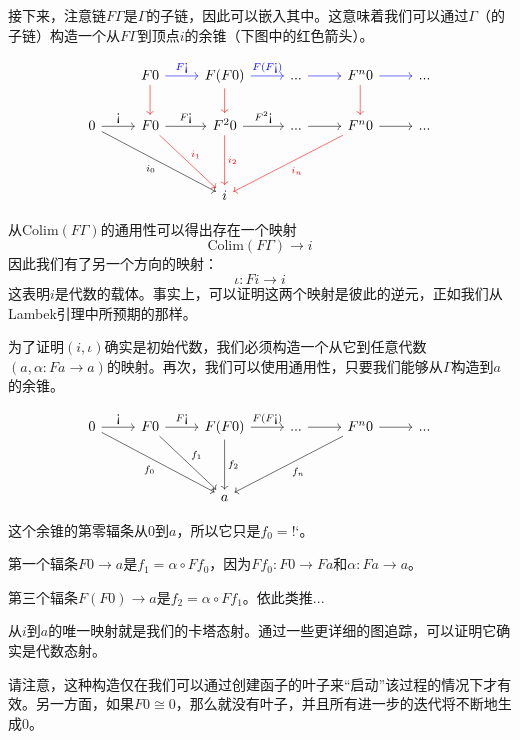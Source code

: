 \documentclass[DaoFP]{subfiles}
\begin{document}
 接下来，注意链$F \Gamma$是$\Gamma$的子链，因此可以嵌入其中。这意味着我们可以通过$\Gamma$（的子链）构造一个从$F \Gamma$到顶点$i$的余锥（下图中的红色箭头）。

 \[
  \begin{tikzcd}
   & F 0
   \arrow[r, blue, "F\mbox{!`}"]
   \arrow[d, red]
   & F (F 0)
   \arrow[r, blue, "F(F\mbox{!`})"]
   \arrow[d, red]
   & ...
   \arrow[r, blue]
   & F^{n} 0
   \arrow[r, blue]
   \arrow[d, red]
   & ...
   \\
   0
   \arrow[r, "\mbox{!`}"]
   \arrow[ddrr,  "i_0"']
   &  F 0
   \arrow[r, "F  \mbox{!`}"]
   \arrow[ddr, red, "i_1"]
   & F^2 0
   \arrow[r, "F^2\mbox{!`}"]
   \arrow[dd, red, "i_2"]
   & ...
   \arrow[r]
   & F^n 0
   \arrow[r]
   \arrow[ddll, red, "i_n"]
   & ...
   \\
   \\
   &&i
  \end{tikzcd}
 \]

 从$\text{Colim} (F \Gamma)$的通用性可以得出存在一个映射
 \[\text{Colim} (F \Gamma) \to i \]
 因此我们有了另一个方向的映射：
 \[ \iota \colon F i \to i \]
 这表明$i$是代数的载体。事实上，可以证明这两个映射是彼此的逆元，正如我们从Lambek引理中所预期的那样。

 为了证明$(i, \iota)$确实是初始代数，我们必须构造一个从它到任意代数$(a, \alpha \colon F a \to a)$的映射。再次，我们可以使用通用性，只要我们能够从$\Gamma$构造到$a$的余锥。

 \[
  \begin{tikzcd}
   0
   \arrow[r, "\mbox{!`}"]
   \arrow[ddrr, "f_0"']
   & F 0
   \arrow[r, "F\mbox{!`}"]
   \arrow[ddr, "f_1"]
   & F (F 0)
   \arrow[r, "F(F\mbox{!`})"]
   \arrow[dd, "f_2"]
   & ...
   \arrow[r]
   & F^n 0
   \arrow[r]
   \arrow[ddll, "f_n"]
   & ...
   \\
   \\
   &&a
  \end{tikzcd}
 \]

 这个余锥的第零辐条从$0$到$a$，所以它只是$f_0 = \mbox{!`}​$。

 第一个辐条$F 0 \to a$是$f_1 = \alpha \circ F f_0$，因为$F f_0 \colon F 0 \to F a$和$\alpha \colon F a \to a$。

 第三个辐条$F (F 0) \to a$是$f_2 = \alpha \circ F f_1$。依此类推...

 从$i$到$a$的唯一映射就是我们的卡塔态射。通过一些更详细的图追踪，可以证明它确实是代数态射。

 请注意，这种构造仅在我们可以通过创建函子的叶子来“启动”该过程的情况下才有效。另一方面，如果$F 0 \cong 0$，那么就没有叶子，并且所有进一步的迭代将不断地生成$0$。
\end{document}
